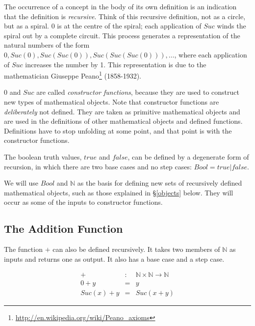 \documentclass[twocolumn]{article}
\newcommand{\nat}{\mathbb{N}}
\begin{document}
The occurrence of a concept in the body of its own definition is an indication
that the definition is {\em recursive}. Think of this recursive definition, not
as a circle, but as a spiral.  $0$ is at the centre of the spiral; each
application of $Suc$ winds the spiral out by a complete circuit.  This process
generates a representation of the natural numbers of the form $0, Suc(0), Suc(Suc(0)),
Suc(Suc(Suc(0))), \ldots$, where each application of $Suc$ increases the number by
1. This representation is due to the mathematician Giuseppe
Peano\footnote{\url{http://en.wikipedia.org/wiki/Peano_axioms}} (1858-1932).

$0$ and $Suc$ are called {\em constructor functions}, because they are used to
construct new types of mathematical objects. Note that constructor functions are
{\em deliberately} not defined. They are taken as primitive mathematical objects
and are used in the definitions of other mathematical objects and defined
functions. Definitions have to stop unfolding at some point, and that point is
with the constructor functions.

The boolean truth values, $true$ and $false$, can be
defined by a degenerate form of recursion, in which there are two base
cases and no step cases: $Bool = true | false$.

We will use $Bool$ and $\nat$ as the basis for defining new sets of recursively
defined mathematical objects, such as those explained in \S\ref{objects}
below. They will occur as some of the inputs to constructor functions.

\subsection{The Addition Function}
\label{addition}

The function $+$ can also be defined recursively. It takes
two members of $\nat$ as inputs and returns one as output.  It
also has a base case and a step case.

\begin{eqnarray}
 + & : & \nat \times \nat \rightarrow \nat \label{type} \\
0+y & = & y  \label{base} \\
Suc(x)+y & = & Suc(x+y) \label{step}
\end{eqnarray}
\end{document}
